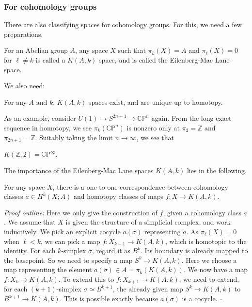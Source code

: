 \documentclass[12pt]{article}
\numberwithin{equation}{section}
\numberwithin{figure}{section}
\theoremstyle{remark}
\renewenvironment{proof}{\noindent\textsl{Proof outline:}}{\hfill$\square$}
\def\bZ{\mathbb{Z}}
\def\CP{\mathbb{CP}}
\begin{document}
\subsubsection{For cohomology groups}

There are also classifying spaces for cohomology groups.
For this, we need a few preparations.
\begin{definition}
For an Abelian group $A$,
any space $X$ such that $\pi_k(X)=A$ and $\pi_\ell(X)=0$ for $\ell\neq k$ is called a $K(A,k)$ space,
and is called the Eilenberg-Mac Lane space.
\end{definition}


We also need:
\begin{theorem}
For any $A$ and $k$,
$K(A,k)$ spaces exist, and are unique up to homotopy.
\end{theorem}

As an example, consider $U(1)\to S^{2n+1}\to \CP^n$ again.
From the long exact sequence in homotopy, we see $\pi_k(\CP^n)$ is nonzero only at $\pi_2=\bZ$ and $\pi_{2n+1}=\bZ$.
Suitably taking the limit $n\to \infty$,
we see that 
\begin{example}
$K(\bZ,2)=\CP^\infty$.
\end{example}

The importance of the Eilenberg-Mac Lane spaces $K(A,k)$ lies in the following.
\begin{theorem}
\label{thm:coh-cl}
For any space $X$, 
there is a one-to-one correspondence between cohomology classes $a \in H^k(X;A)$ 
and homotopy classes of maps $f: X\to K(A,k)$.
\end{theorem}
\begin{proof}
Here we only give the construction of $f$, given a cohomology class $a$.
We assume that $X$ is given the structure of a simplicial complex,
and work inductively.
We pick an explicit cocycle $a(\sigma)$ representing $a$.
As $\pi_{\ell}(X)=0$ when $\ell<k$,
we can pick a map $f:X_{k-1}\to K(A,k)$, which is homotopic to the identity.
For each $k$-simplex $\sigma$, regard it as $B^k$.
Its boundary is already mapped to the basepoint.
So we need to specify a map $S^k \to K(A,k)$.
Here we choose a map representing the element $a(\sigma)\in A=\pi_k(K(A,k))$. 
We now have a map $f:X_k \to K(A,k)$.
To extend this to $f:X_{k+1}\to K(A,k)$,
we need to extend, for each $(k+1)$-simplex $\sigma\simeq B^{k+1}$,
the already given map $S^k \to K(A,k)$
to $B^{k+1}\to K(A,k)$.
This is possible exactly because $a(\sigma)$ is a cocycle.
\end{proof}
\end{document}
